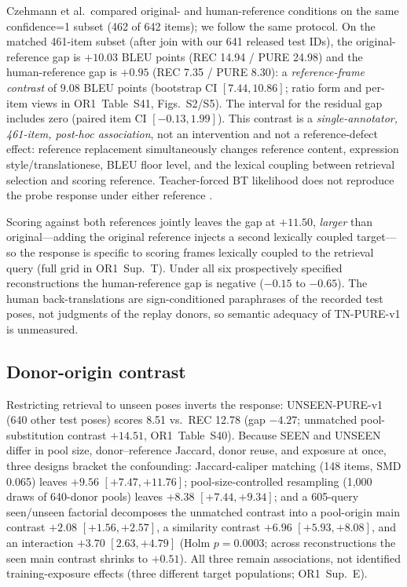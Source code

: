 \documentclass[pdflatex,sn-chicago]{sn-jnl}
\begin{document}
Czehmann et al.\ compared original- and human-reference conditions on the same confidence=1 subset (462 of 642 items); we follow the same protocol. On the matched 461-item subset (after join with our 641 released test IDs), the original-reference gap is $+10.03$ BLEU points (REC 14.94 / PURE 24.98) and the human-reference gap is $+0.95$ (REC 7.35 / PURE 8.30): a \emph{reference-frame contrast} of $9.08$ BLEU points (bootstrap CI $[7.44, 10.86]$; ratio form and per-item views in OR1~Table~S41, Figs.~S2/S5). The interval for the residual gap includes zero (paired item CI $[-0.13, 1.99]$). This contrast is a \emph{single-annotator, 461-item, post-hoc association}, not an intervention and not a reference-defect effect: reference replacement simultaneously changes reference content, expression style/translationese, BLEU floor level, and the lexical coupling between retrieval selection and scoring reference. Teacher-forced BT likelihood does not reproduce the probe response under either reference \cite{jiang2025meaningful}.

Scoring against both references jointly leaves the gap at $+11.50$, \emph{larger} than original---adding the original reference injects a second lexically coupled target---so the response is specific to scoring frames lexically coupled to the retrieval query (full grid in OR1~Sup.~T). Under all six prospectively specified reconstructions the human-reference gap is negative ($-0.15$ to $-0.65$). The human back-translations are sign-conditioned paraphrases of the recorded test poses, not judgments of the replay donors, so semantic adequacy of TN-PURE-v1 is unmeasured.

\subsection{Donor-origin contrast}
\label{sec:exposure_results}
Restricting retrieval to unseen poses inverts the response: UNSEEN-PURE-v1 (640 other test poses) scores 8.51 vs.\ REC 12.78 (gap $-4.27$; unmatched pool-substitution contrast $+14.51$, OR1~Table~S40). Because SEEN and UNSEEN differ in pool size, donor--reference Jaccard, donor reuse, and exposure at once, three designs bracket the confounding: Jaccard-caliper matching (148 items, SMD 0.065) leaves $+9.56$ $[+7.47,+11.76]$; pool-size-controlled resampling (1{,}000 draws of 640-donor pools) leaves $+8.38$ $[+7.44,+9.34]$; and a 605-query seen/unseen factorial decomposes the unmatched contrast into a pool-origin main contrast $+2.08$ $[+1.56,+2.57]$, a similarity contrast $+6.96$ $[+5.93,+8.08]$, and an interaction $+3.70$ $[2.63,+4.79]$ (Holm $p{=}0.0003$; across reconstructions the seen main contrast shrinks to $+0.51$). All three remain associations, not identified training-exposure effects (three different target populations; OR1~Sup.~E).
\end{document}
